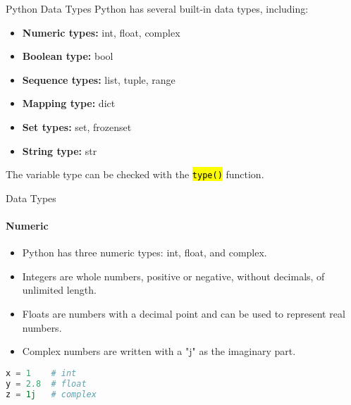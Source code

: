 \documentclass[
    aspectratio=169, 
    usepdftitle=false, 
    xcolor={dvipsnames},
    hyperref={
        colorlinks,
        linkcolor=black,
        urlcolor=blue}
    ]{beamer}
\let\OldTexttt\texttt
\renewcommand{\texttt}[1]{\OldTexttt{\hl{#1}}}%
\begin{document}
\begin{frame}[fragile]{Python Data Types}
    Python has several built-in data types, including:
    \begin{itemize}
        \item \textbf{Numeric types:} int, float, complex
        \item \textbf{Boolean type:} bool
        \item \textbf{Sequence types:} list, tuple, range
        \item \textbf{Mapping type:} dict
        \item \textbf{Set types:} set, frozenset
        \item \textbf{String type:} str
    \end{itemize}
    The variable type can be checked with the \texttt{type()} function.
\end{frame}



\begin{frame}[fragile]{Data Types}
    \framesubtitle{Numeric}
    \begin{itemize}
        \item Python has three numeric types: int, float, and complex.
        \item Integers are whole numbers, positive or negative, without decimals, of unlimited length.
        \item Floats are numbers with a decimal point and can be used to represent real numbers.
        \item Complex numbers are written with a "j" as the imaginary part.
    \end{itemize}
    \begin{lstlisting}[language=Python]
x = 1    # int
y = 2.8  # float
z = 1j   # complex
\end{lstlisting}
\end{frame}
\end{document}
